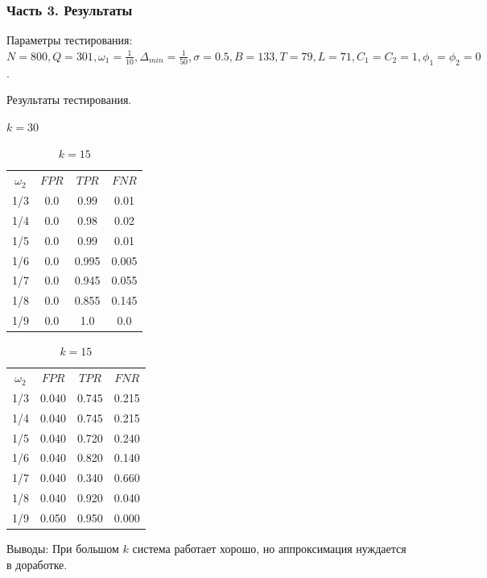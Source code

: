 \documentclass[pdf, 9pt,intlimits, unicode]{beamer}
\begin{document}
	\begin{frame}
		\frametitle{Часть 3. Результаты}
		{\color{blue} Параметры тестирования:} $ N = 800, Q=301, \omega_1=\frac{1}{10} , \Delta_{min}=\frac{1}{50}, \sigma=0.5, B=133, T=79, L=71, C_1=C_2=1, \phi_1=\phi_2=0$.
		
		\bigskip
		
		\begin{table}[!hhh]
			\center
			\caption{Результаты тестирования.}
			\begin{minipage}{.5\linewidth}
				\caption{$ k=30 $}
				\centering
				\begin{tabular}{cccc}
					\toprule
					$ \omega_2 $ & $ FPR $ &    $ TPR $ &    $ FNR $ \\
					1/3 &  0.0 &   0.99 &   0.01 \\
					1/4 &  0.0 &   0.98 &   0.02 \\
					1/5 &  0.0 &   0.99 &   0.01 \\
					1/6 &  0.0 &  0.995 &  0.005 \\				
					1/7 &  0.0 &  0.945 &  0.055 \\
					1/8 &  0.0 &  0.855 &  0.145 \\
					1/9 &  0.0 &    1.0 &    0.0 \\
					\bottomrule
				\end{tabular}
			\end{minipage}%
			\begin{minipage}{.5\linewidth}
				\caption{$ k=15 $}
				\centering
				\begin{tabular}{cccc}
					\toprule
					$ \omega_2 $ & $ FPR $ &    $ TPR $ &    $ FNR $ \\
					1/3 &  0.040 & 0.745 & 0.215  \\
					1/4 &  0.040 & 0.745 & 0.215 \\
					1/5 &  0.040 & 0.720 & 0.240 \\
					1/6 &  0.040 & 0.820 & 0.140 \\				
					1/7 &  0.040 & 0.340 & 0.660 \\
					1/8 &  0.040 & 0.920 & 0.040  \\
					1/9 &  0.050 & 0.950 & 0.000  \\
					\bottomrule
				\end{tabular}
			\end{minipage}%
		\end{table}
	
	
		\bigskip
		
		{\color{blue} Выводы:} При большом $ k $ система работает хорошо, но аппроксимация нуждается в доработке.
	
	\end{frame}	
	
\end{document}
